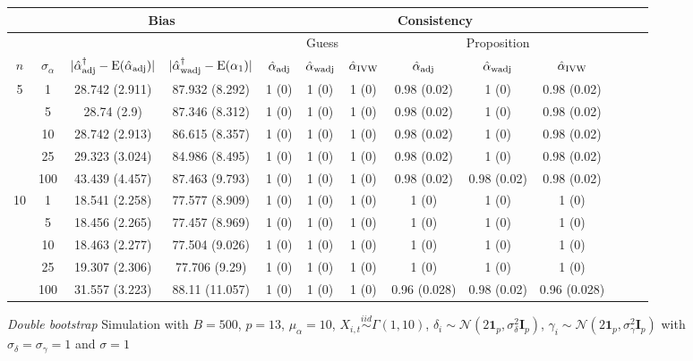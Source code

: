 \documentclass[10pt]{article}
\newcommand{\simiid}{\stackrel{iid}{\sim}} %
\def\normal#1#2{\mathcal{N}(#1,#2)} %
\def\E#1{\mathrm{E}(#1)} %
\theoremstyle{definition}
\begin{document}

\begin{sidewaysfigure}
\centering
\caption{\emph{Double bootstrap} Simulation  with $B = 500$, $p = 13$, $\mu_{\alpha}=10$, $X_{i,t} \simiid \Gamma(1,10)$, $\delta_i \sim \normal{2\mathbf{1}_p}{\sigma^2_{\delta}\mathbf{I}_p}$, $\gamma_i \sim \normal{2\mathbf{1}_p}{\sigma^2_{\gamma}\mathbf{I}_p}$ with $\sigma_{\delta}=\sigma_{\gamma}=1$ and $\sigma = 1$}
\begin{tabular}{cc|cc|ccc|ccc|ccc}
  & & \multicolumn{2}{c|}{Bias}  & \multicolumn{6}{c}{Consistency}  \\ 
  \hline 
   &  & & & \multicolumn{3}{|c|}{Guess} & \multicolumn{3}{|c|}{Proposition}  \\ 
 $n$   & $\sigma_{\alpha}$ & $|\hat{\alpha}_{\rm adj}^{\dagger}-\E{\hat{\alpha}_{\rm adj}}|$ & $|\hat{\alpha}_{\rm wadj}^{\dagger}-\E{\alpha_1}|$ & $\hat{\alpha}_{\rm adj}$  & $\hat{\alpha}_{\rm wadj}$ & $\hat{\alpha}_{\rm IVW}$ & $\hat{\alpha}_{\rm adj}$  & $\hat{\alpha}_{\rm wadj}$ & $\hat{\alpha}_{\rm IVW}$  \\[.3cm]  
  \hline
  \multirow{5}{*}{5}  & 1  & 28.742 (2.911) & 87.932 (8.292) & 1 (0) & 1 (0) & 1 (0) & 0.98 (0.02) & 1 (0) & 0.98 (0.02) \\ 
   & 5  & 28.74 (2.9) & 87.346 (8.312) & 1 (0) & 1 (0) & 1 (0) & 0.98 (0.02) & 1 (0) & 0.98 (0.02) \\ 
  & 10  & 28.742 (2.913) & 86.615 (8.357) & 1 (0) & 1 (0) & 1 (0) & 0.98 (0.02) & 1 (0) & 0.98 (0.02) \\ 
   & 25  & 29.323 (3.024) & 84.986 (8.495) & 1 (0) & 1 (0) & 1 (0) & 0.98 (0.02) & 1 (0) & 0.98 (0.02) \\ 
 & 100  & 43.439 (4.457) & 87.463 (9.793) & 1 (0) & 1 (0) & 1 (0) & 0.98 (0.02) & 0.98 (0.02) & 0.98 (0.02) \\[.3cm]  
    \multirow{5}{*}{10}  & 1  & 18.541 (2.258) & 77.577 (8.909) & 1 (0) & 1 (0) & 1 (0) & 1 (0) & 1 (0) & 1 (0) \\ 
  & 5  & 18.456 (2.265) & 77.457 (8.969) & 1 (0) & 1 (0) & 1 (0) & 1 (0) & 1 (0) & 1 (0) \\ 
   & 10  & 18.463 (2.277) & 77.504 (9.026) & 1 (0) & 1 (0) & 1 (0) & 1 (0) & 1 (0) & 1 (0) \\ 
   & 25  & 19.307 (2.306) & 77.706 (9.29) & 1 (0) & 1 (0) & 1 (0) & 1 (0) & 1 (0) & 1 (0) \\ 
& 100  & 31.557 (3.223) & 88.11 (11.057) & 1 (0) & 1 (0) & 1 (0) & 0.96 (0.028) & 0.98 (0.02) & 0.96 (0.028) \\[.3cm]  

\end{tabular}
\end{sidewaysfigure}
\end{document}
